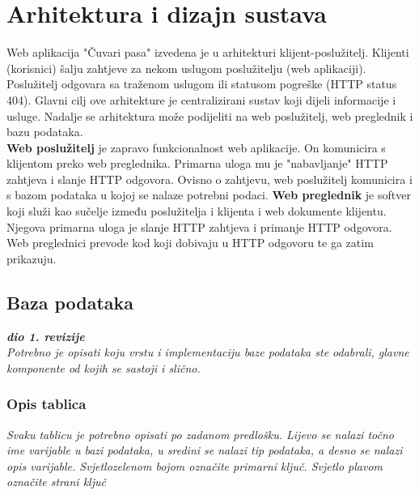 \chapter{Arhitektura i dizajn sustava}

		Web aplikacija "Čuvari pasa" izvedena je u arhitekturi klijent-poslužitelj. Klijenti (korisnici) šalju zahtjeve za nekom uslugom poslužitelju (web aplikaciji). Poslužitelj odgovara sa traženom uslugom ili statusom pogreške (HTTP status 404). Glavni cilj ove arhitekture je centralizirani sustav koji dijeli informacije i usluge.
		Nadalje se arhitektura može podijeliti na web poslužitelj, web preglednik i bazu podataka.\\
		\newline
		\textbf{Web poslužitelj} je zapravo funkcionalnost web aplikacije. On komunicira s klijentom preko web preglednika. Primarna uloga mu je "nabavljanje" HTTP zahtjeva i slanje HTTP odgovora. Ovisno o zahtjevu, web poslužitelj komunicira i s bazom podataka u kojoj se nalaze potrebni podaci. 
		\newline
		\textbf{Web preglednik} je softver koji služi kao sučelje između poslužitelja i klijenta i web dokumente klijentu. Njegova primarna uloga je slanje HTTP zahtjeva i primanje HTTP odgovora. Web preglednici prevode kod koji dobivaju u HTTP odgovoru te ga zatim prikazuju.
		
		

	
		

		

				
		\section{Baza podataka}
			
			\textbf{\textit{dio 1. revizije}}\\
			
		\textit{Potrebno je opisati koju vrstu i implementaciju baze podataka ste odabrali, glavne komponente od kojih se sastoji i slično.}
		
			\subsection{Opis tablica}
			

				\textit{Svaku tablicu je potrebno opisati po zadanom predlošku. Lijevo se nalazi točno ime varijable u bazi podataka, u sredini se nalazi tip podataka, a desno se nalazi opis varijable. Svjetlozelenom bojom označite primarni ključ. Svjetlo plavom označite strani ključ}
				
